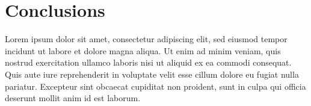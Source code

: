 \documentclass{article}
\begin{document}








\section{Conclusions}

Lorem ipsum dolor sit amet, consectetur adipiscing elit, sed eiusmod tempor incidunt ut labore et dolore magna aliqua. Ut enim ad minim veniam, quis nostrud exercitation ullamco laboris nisi ut aliquid ex ea commodi consequat. Quis aute iure reprehenderit in voluptate velit esse cillum dolore eu fugiat nulla pariatur. Excepteur sint obcaecat cupiditat non proident, sunt in culpa qui officia deserunt mollit anim id est laborum.
\end{document}
